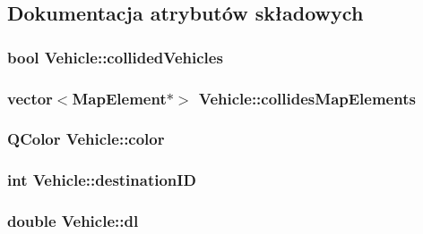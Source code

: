 \subsection{Dokumentacja atrybutów składowych}
\hypertarget{class_vehicle_a28f41cf00d7689c39e29bc951e3e0472}{
\subsubsection[{collided\-Vehicles}]{\setlength{\rightskip}{0pt plus 5cm}bool Vehicle\-::collided\-Vehicles\hspace{0.3cm}{\ttfamily [private]}}}\label{class_vehicle_a28f41cf00d7689c39e29bc951e3e0472}
\hypertarget{class_vehicle_ade840ce20f05a39006a8a44a26ac42bf}{
\subsubsection[{collides\-Map\-Elements}]{\setlength{\rightskip}{0pt plus 5cm}vector$<${\bf Map\-Element}$\ast$$>$ Vehicle\-::collides\-Map\-Elements\hspace{0.3cm}{\ttfamily [private]}}}\label{class_vehicle_ade840ce20f05a39006a8a44a26ac42bf}
\hypertarget{class_vehicle_a290ebfd05412ee45125dbc282f724488}{
\subsubsection[{color}]{\setlength{\rightskip}{0pt plus 5cm}Q\-Color Vehicle\-::color\hspace{0.3cm}{\ttfamily [private]}}}\label{class_vehicle_a290ebfd05412ee45125dbc282f724488}
\hypertarget{class_vehicle_a75d0148cd658133b6d6a550c27bfb936}{
\subsubsection[{destination\-I\-D}]{\setlength{\rightskip}{0pt plus 5cm}int Vehicle\-::destination\-I\-D\hspace{0.3cm}{\ttfamily [private]}}}\label{class_vehicle_a75d0148cd658133b6d6a550c27bfb936}
\hypertarget{class_vehicle_a4a1cd6d5bc788fa5e99ed463e6d104de}{
\subsubsection[{dl}]{\setlength{\rightskip}{0pt plus 5cm}double Vehicle\-::dl\hspace{0.3cm}{\ttfamily [private]}}}\label{class_vehicle_a4a1cd6d5bc788fa5e99ed463e6d104de}
